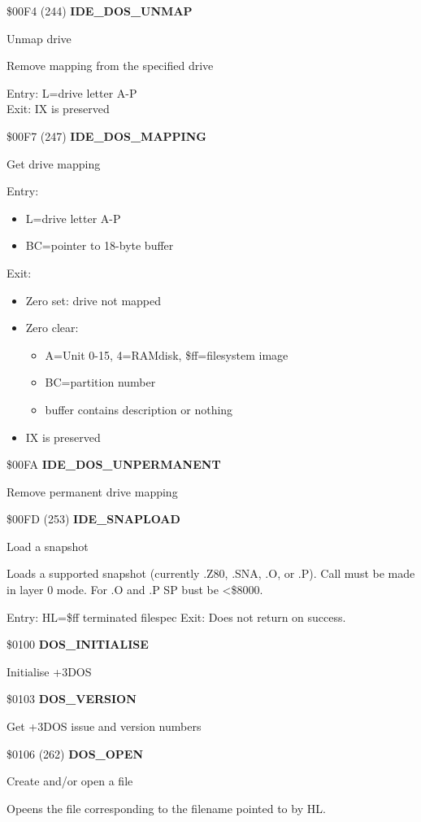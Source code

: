 \$00F4 (244) \textbf{IDE\_DOS\_UNMAP}

Unmap drive

Remove mapping from the specified drive

Entry: L=drive letter A-P\\
Exit: IX is preserved

\$00F7 (247) \textbf{IDE\_DOS\_MAPPING}

Get drive mapping

Entry:
\begin{itemize}
\item[] L=drive letter A-P
\item[] BC=pointer to 18-byte buffer
\end{itemize}
Exit:
\begin{itemize}
\item[] Zero set: drive not mapped
\item[] Zero clear:
  \begin{itemize}
  \item[] A=Unit 0-15, 4=RAMdisk, \$ff=filesystem image
  \item[] BC=partition number
  \item[] buffer contains description or nothing
  \end{itemize}
\item[] IX is preserved
\end{itemize}

\$00FA \textbf{IDE\_DOS\_UNPERMANENT}

Remove permanent drive mapping

\$00FD (253) \textbf{IDE\_SNAPLOAD}

Load a snapshot

Loads a supported snapshot (currently .Z80, .SNA, .O, or .P). Call
must be made in layer 0 mode. For .O and .P SP bust be <\$8000.

Entry: HL=\$ff terminated filespec
Exit: Does not return on success.

\$0100 \textbf{DOS\_INITIALISE}

Initialise +3DOS

\$0103 \textbf{DOS\_VERSION}

Get +3DOS issue and version numbers

\$0106 (262) \textbf{DOS\_OPEN}

Create and/or open a file

Opeens the file corresponding to the filename pointed to by HL.

